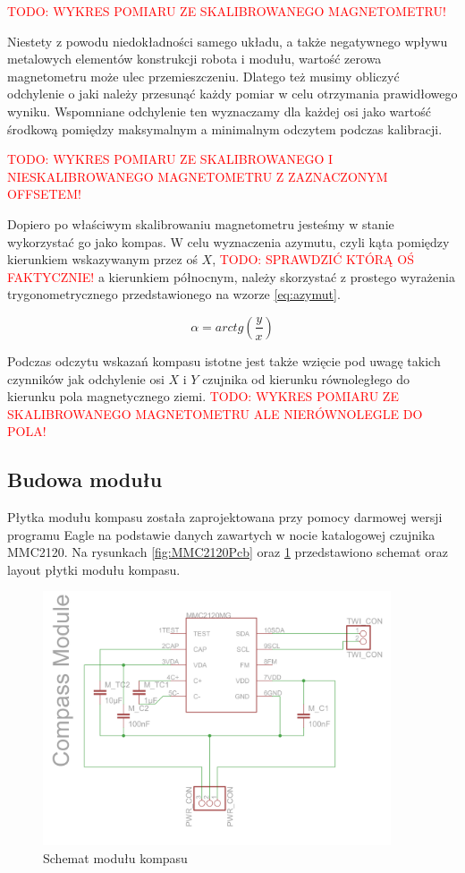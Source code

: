 \textcolor{red}{TODO: WYKRES POMIARU ZE SKALIBROWANEGO MAGNETOMETRU!}

Niestety z powodu niedokładności samego układu, a także negatywnego wpływu metalowych elementów konstrukcji robota i modułu, wartość zerowa magnetometru może ulec przemieszczeniu. Dlatego też musimy obliczyć odchylenie o jaki należy przesunąć każdy pomiar w celu otrzymania prawidłowego wyniku. Wspomniane odchylenie ten wyznaczamy dla każdej osi jako wartość środkową pomiędzy maksymalnym a minimalnym odczytem podczas kalibracji.

\textcolor{red}{TODO: WYKRES POMIARU ZE SKALIBROWANEGO I NIESKALIBROWANEGO MAGNETOMETRU Z ZAZNACZONYM OFFSETEM!}

Dopiero po właściwym skalibrowaniu magnetometru jesteśmy w stanie wykorzystać go jako kompas. W celu wyznaczenia azymutu, czyli kąta pomiędzy kierunkiem wskazywanym przez oś $X$, \textcolor{red}{TODO: SPRAWDZIĆ KTÓRĄ OŚ FAKTYCZNIE!} a kierunkiem północnym, należy skorzystać z prostego wyrażenia trygonometrycznego przedstawionego na wzorze \ref{eq:azymut}.

\begin{equation}
  \label{eq:azymut}
  \alpha = arctg \left( \frac{y}{x} \right)
\end{equation}

Podczas odczytu wskazań kompasu istotne jest także wzięcie pod uwagę takich czynników jak odchylenie osi $X$ i $Y$ czujnika od kierunku równoległego do kierunku pola magnetycznego ziemi.
\textcolor{red}{TODO: WYKRES POMIARU ZE SKALIBROWANEGO MAGNETOMETRU ALE NIERÓWNOLEGLE DO POLA!}

\subsection{Budowa modułu}
Płytka modułu kompasu została zaprojektowana przy pomocy darmowej wersji programu Eagle na podstawie danych zawartych w nocie katalogowej czujnika MMC2120. Na rysunkach \ref{fig:MMC2120Pcb} oraz \ref{fig:MMC2120Sch} przedstawiono schemat oraz layout płytki modułu kompasu.

\begin{figure}[!ht]
 \centering
 \includegraphics[height=75mm]{../images/ch04/mmc2120mgsch.png}
 \caption{Schemat modułu kompasu}
 \label{fig:MMC2120Sch}
\end{figure}

